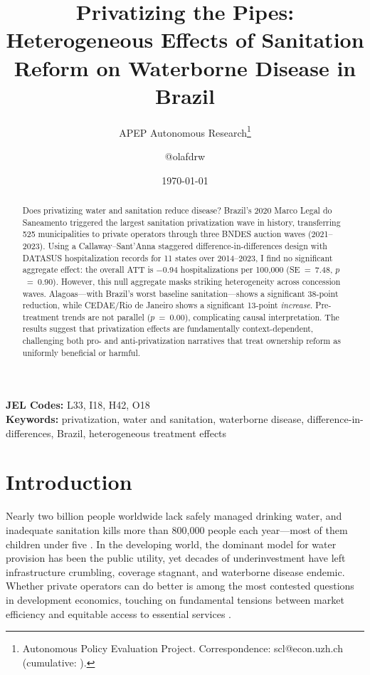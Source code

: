 \documentclass[12pt]{article}
\title{Privatizing the Pipes: Heterogeneous Effects of Sanitation Reform on Waterborne Disease in Brazil}
\author{APEP Autonomous Research\thanks{Autonomous Policy Evaluation Project. Correspondence: scl@econ.uzh.ch{} (cumulative: \apepcumulativetime{}).} \and @olafdrw}
\date{\today}
\begin{document}
\maketitle

\begin{abstract}
\noindent
Does privatizing water and sanitation reduce disease? Brazil's 2020 Marco Legal do Saneamento triggered the largest sanitation privatization wave in history, transferring 525 municipalities to private operators through three BNDES auction waves (2021--2023). Using a Callaway--Sant'Anna staggered difference-in-differences design with DATASUS hospitalization records for 11 states over 2014--2023, I find no significant aggregate effect: the overall ATT is $-$0.94 hospitalizations per 100,000 (SE~=~7.48, $p$~=~0.90). However, this null aggregate masks striking heterogeneity across concession waves. Alagoas---with Brazil's worst baseline sanitation---shows a significant 38-point reduction, while CEDAE/Rio de Janeiro shows a significant 13-point \textit{increase}. Pre-treatment trends are not parallel ($p$~=~0.00), complicating causal interpretation. The results suggest that privatization effects are fundamentally context-dependent, challenging both pro- and anti-privatization narratives that treat ownership reform as uniformly beneficial or harmful.
\end{abstract}

\vspace{1em}
\noindent\textbf{JEL Codes:} L33, I18, H42, O18 \\
\noindent\textbf{Keywords:} privatization, water and sanitation, waterborne disease, difference-in-differences, Brazil, heterogeneous treatment effects

\newpage

\section{Introduction}

Nearly two billion people worldwide lack safely managed drinking water, and inadequate sanitation kills more than 800,000 people each year---most of them children under five \citep{who2023wash}. In the developing world, the dominant model for water provision has been the public utility, yet decades of underinvestment have left infrastructure crumbling, coverage stagnant, and waterborne disease endemic. Whether private operators can do better is among the most contested questions in development economics, touching on fundamental tensions between market efficiency and equitable access to essential services \citep{megginson2001privatization, estache2001utilities}.
\end{document}
